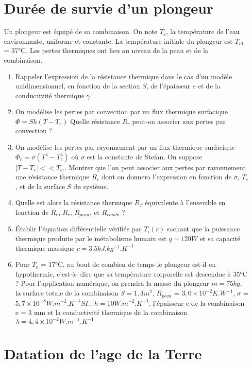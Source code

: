\documentclass{article}
\begin{document}
\section{Durée de survie d'un plongeur }
Un plongeur est équipé de sa combinaison.
On note $T_e$, la température de l’eau environnante, uniforme et constante. La température initiale du plongeur est $T_{i0}$ = 37°C. Les pertes thermiques ont lieu au niveau de la peau et de la
combinaison. 
\begin{enumerate}
    \item Rappeler l’expression de la résistance thermique dans le cas d’un modèle unidimensionnel,
en fonction de la section $S$, de l’épaisseur $e$ et de la conductivité thermique $\gamma$.
\item On modélise les pertes par convection par un flux thermique surfacique $\Phi = Sh(T-T_e)$
Quelle résistance $R_c$ peut-on associer aux pertes par convection ? 
\item  On modèlise les pertes par rayonnement par un flux thermique surfacique $\Phi_r = \sigma (T^4 - T_e^4)$
où $\sigma$ est la constante de Stefan. On suppose $|T-T_e|<<T_e$,. Montrer que l’on peut associer aux
pertes par rayonnement une résistance thermique $R_r$ dont on donnera l’expression en fonction
de $\sigma$, $T_e$, et de la surface $S$ du système. 
\item  Quelle est alors la résistance thermique $R_T$ équivalente à l’ensemble en fonction de $R_c$, $R_r$, $R_{peau}$, et $R_{combi}$ ?
\item  Établir l’équation différentielle vérifiée par $T_i(r)$ sachant que la puissance thermique produite par le métabolisme humain est $q = 120 W$ et sa capacité thermique massique $c = 3.5 kJ. kg^{-1}.K^{-1}$
\item Pour $T_e$ = 17°C, au bout de combien de temps le plongeur est-il en hypothermie, c’est-à- dire que sa température corporelle est descendue à 35°C ? Pour l’application numérique, on prendra la masse du plongeur $ m = 75 kg$, la surface totale de la combinaison $S = 1,3 m^2$, $R_{peau}$ = $3,0 \times 10^{-2} K.W^{-1}$, $\sigma$ =$5,7 \times 10^{-8} W.m^{-2} . K^{-4} SI.$,  $h = 10  W.m^{-2}.K^{-1}$, l’épaisseur e de la combinaison e = 3 mm et la conductivité thermique de la combinaison $\lambda = 4,4 \times 10^{-2} W.m^{-1}.K^{-1}$



\end{enumerate}

\section{Datation de l'age de la Terre}
\end{document}
